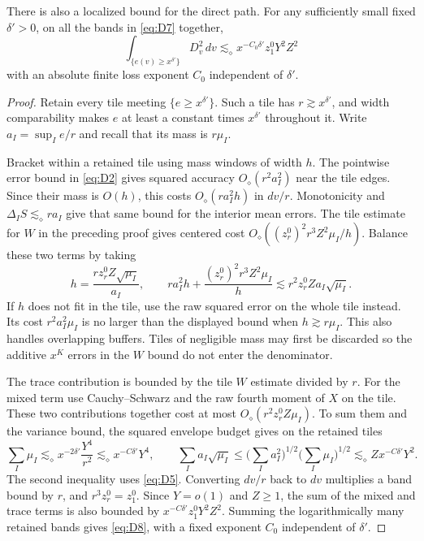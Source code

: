\begin{lemma}\label{lem:statistics-localized}
There is also a localized bound for the direct path. For any sufficiently small fixed \(\delta'>0\), on all the bands in \eqref{eq:D7} together,
\begin{equation}
\int_{\{e(v)\ge x^{\delta'}\}} D_v^2\,dv
       \lesssim_\diamond x^{-C_0\delta'} z_1^0 Y^2 Z^2                 \tag{D8}\label{eq:D8}
\end{equation}
with an absolute finite loss exponent \(C_0\) independent of \(\delta'\). \end{lemma}
\begin{proof}
Retain every tile meeting $\{e\ge x^{\delta'}\}$.  Such a tile
has $r\gtrsim x^{\delta'}$, and width comparability makes $e$ at least
a constant times $x^{\delta'}$ throughout it.  Write
$a_I=\sup_I e/r$ and recall that its mass is $r\mu_I$.

Bracket within a retained tile using mass windows of width $h$.
The pointwise error bound in \eqref{eq:D2} gives squared accuracy
$O_\diamond(r^2a_I^2)$ near the tile edges.  Since their mass is
$O(h)$, this costs $O_\diamond(ra_I^2h)$ in $dv/r$.
Monotonicity and $\Delta_IS\lesssim_\diamond ra_I$ give that same
bound for the interior mean errors.  The tile estimate for $W$ in the
preceding proof gives centered cost
$O_\diamond((z_r^0)^2r^3Z^2\mu_I/h)$.  Balance these two terms by taking
\[
 h=\frac{rz_r^0Z\sqrt{\mu_I}}{a_I},\qquad
 ra_I^2h+\frac{(z_r^0)^2r^3Z^2\mu_I}{h}
       \lesssim r^2z_r^0Z a_I\sqrt{\mu_I}.
\]
If $h$ does not fit in the tile, use the raw squared error on the whole
tile instead.  Its cost $r^2a_I^2\mu_I$ is no larger than the displayed
bound when $h\gtrsim r\mu_I$.  This also handles overlapping buffers.
Tiles of negligible mass may first be discarded so the additive
$x^K$ errors in the $W$ bound do not enter the denominator.

The trace contribution is bounded by the tile $W$ estimate divided
by $r$.  For the mixed term use Cauchy--Schwarz and the raw fourth
moment of $X$ on the tile.  These two contributions together cost at
most $O_\diamond(r^2z_r^0Z\mu_I)$.  To sum them and the variance
bound, the squared envelope budget gives on the retained tiles
\[
 \sum_I\mu_I
 \lesssim_\diamond x^{-2\delta'}\frac{Y^4}{r^2}
 \lesssim_\diamond x^{-C\delta'}Y^4,
 \qquad
 \sum_I a_I\sqrt{\mu_I}
 \le\Big(\sum_Ia_I^2\Big)^{1/2}
       \Big(\sum_I\mu_I\Big)^{1/2}
 \lesssim_\diamond Zx^{-C\delta'}Y^2.
\]
The second inequality uses \eqref{eq:D5}.  Converting $dv/r$ back to
$dv$ multiplies a band bound by $r$, and $r^3z_r^0=z_1^0$.
Since $Y=o(1)$ and $Z\ge1$, the sum of the mixed and trace terms is
also bounded by $x^{-C\delta'}z_1^0Y^2Z^2$.  Summing the logarithmically
many retained bands gives \eqref{eq:D8}, with a fixed exponent $C_0$
independent of $\delta'$.

\end{proof}


